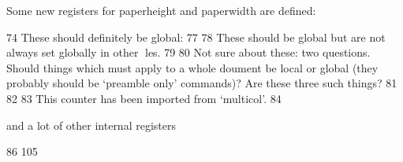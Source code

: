 Some new registers for paperheight and paperwidth are defined:

\begin{Code}
74 \newdimen{} \newdimen{} \newif \if@insert
These should definitely be global:
77 \newif \if@fcolmade
78 \newif \if@specialpage \@specialpagefalse
These should be global but are not always set globally in other les.
79 \newif \if@firstcolumn \@firstcolumntrue
80 \newif \if@twocolumn \@twocolumnfalse
Not sure about these: two questions. Should things which must apply to a whole
doument be local or global (they probably should be `preamble only' commands)?
Are these three such things?
81 \newif \if@twoside \@twosidefalse
82 \newif \if@reversemargin \@reversemarginfalse
83 \newif \if@mparswitch \@mparswitchfalse
This counter has been imported from `multicol'.
84 \newcount {} \col@number \@ne
\end{Code}

and a lot of other internal registers

\begin{Code}
86 \newcount{} \newdimen{} \newcount{} \newdimen{} \newcount{} \newdimen{} \newcount{} \newdimen{} \newdimen{} \newdimen{} \newdimen{} \newdimen{} \newdimen{} \newdimen\@mparbottom \@mparbottom{} \newcount{} \newbox{} \newbox{} \newbox{} \def\@thehead{\@oddhead} %
105 \def\@thefoot{\@oddfoot}
\end{Code}

